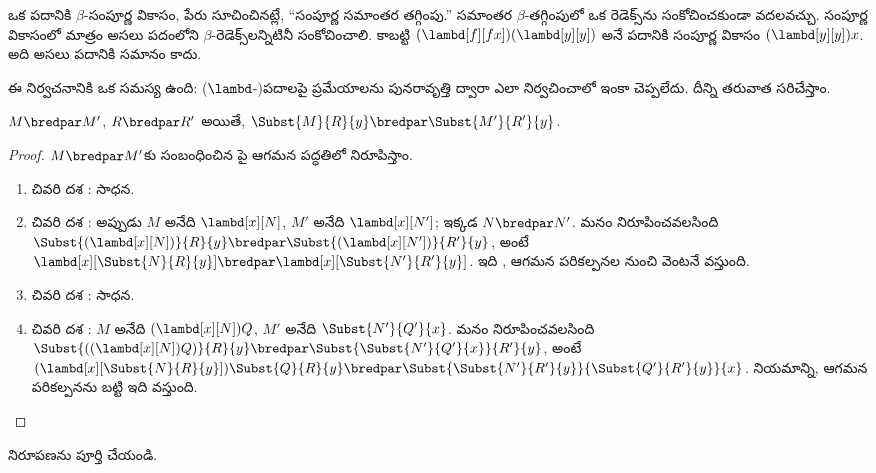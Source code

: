 \documentclass[../../../include/open-logic-section]{subfiles}
\begin{document}
ఒక పదానికి $\beta$-సంపూర్ణ వికాసం, పేరు సూచించినట్లే,
“సంపూర్ణ సమాంతర తగ్గింపు.” సమాంతర $\beta$-తగ్గింపులో
ఒక రెడెక్స్‌ను సంకోచించకుండా వదలవచ్చు. సంపూర్ణ వికాసంలో
మాత్రం అసలు పదంలోని $\beta$-రెడెక్స్‌లన్నిటినీ సంకోచించాలి.
కాబట్టి $(\lambd[f][fx])(\lambd[y][y])$ అనే పదానికి
సంపూర్ణ వికాసం $(\lambd[y][y])x$. అది అసలు పదానికి సమానం కాదు.

\begin{editorial}
  ఈ నిర్వచనానికి ఒక సమస్య ఉంది: ($\lambd$-)పదాలపై
  ప్రమేయాలను పునరావృత్తి ద్వారా ఎలా నిర్వచించాలో ఇంకా చెప్పలేదు. దీన్ని తరువాత సరిచేస్తాం.
\end{editorial}

\begin{lem}
  $M \bredpar M'$, $R \bredpar R'$ అయితే,
  $\Subst{M}{R}{y} \bredpar \Subst{M'}{R'}{y}$.
\end{lem}

\begin{proof}
  $M \bredpar M'$కు సంబంధించిన పై
  ఆగమన పద్ధతిలో నిరూపిస్తాం.
  \begin{enumerate}
    \item చివరి దశ : సాధన.
    \item చివరి దశ : అప్పుడు $M$ అనేది
      $\lambd[x][N]$, $M'$ అనేది $\lambd[x][N']$;
      ఇక్కడ $N \bredpar N'$. మనం నిరూపించవలసింది
      $\Subst{(\lambd[x][N])}{R}{y} \bredpar
      \Subst{(\lambd[x][N'])}{R'}{y}$, అంటే
      $\lambd[x][\Subst{N}{R}{y}] \bredpar
      \lambd[x][\Subst{N'}{R'}{y}]$.
      ఇది , ఆగమన పరికల్పనల నుంచి
      వెంటనే వస్తుంది.
    \item చివరి దశ : సాధన.
    \item చివరి దశ : $M$ అనేది
      $(\lambd[x][N])Q$, $M'$ అనేది $\Subst{N'}{Q'}{x}$.
      మనం నిరూపించవలసింది
      $\Subst{((\lambd[x][N])Q)}{R}{y} \bredpar
      \Subst{\Subst{N'}{Q'}{x}}{R'}{y}$, అంటే
      $(\lambd[x][\Subst{N}{R}{y}])\Subst{Q}{R}{y} \bredpar
      \Subst{\Subst{N'}{R'}{y}}{\Subst{Q'}{R'}{y}}{x}$.
       నియమాన్ని, ఆగమన పరికల్పనను బట్టి ఇది వస్తుంది.
  \end{enumerate}
\end{proof}

\begin{prob}
   నిరూపణను పూర్తి చేయండి.
\end{prob}
\end{document}

